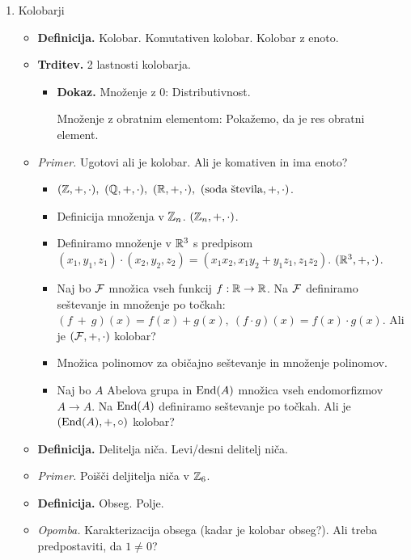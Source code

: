 \begin{enumerate}
    \item Kolobarji
    \begin{itemize}
        \item \colorbox{purple!30}{\textbf{Definicija.}} Kolobar. Komutativen kolobar. Kolobar z enoto.
        \item \colorbox{blue!30}{\textbf{Trditev.}} 2 lastnosti kolobarja.
        \begin{itemize}
            \item \colorbox{green!30}{\textbf{Dokaz.}} Množenje z $0$: Distributivnost.
            
            Množenje z obratnim elementom: Pokažemo, da je res obratni element.
        \end{itemize}
        \item \colorbox{yellow!30}{\emph{Primer.}}  Ugotovi ali je kolobar. Ali je komativen in ima enoto?
        \begin{itemize}
            \item  $(\ZZ, +, \cdot), \  (\QQ, +, \cdot), \ (\RR, +, \cdot), \ (\text{soda števila}, +, \cdot)$.
            \item Definicija množenja v $\mathbb{Z}_n$. $(\mathbb{Z}_n, +, \cdot)$. 
            \item Definiramo množenje v $\mathbb{R}^3$ s predpisom $(x_1, y_1, z_1) \cdot (x_2, y_2, z_2) = (x_1 x_2, x_1y_2 + y_1 z_1, z_1 z_2)$. $(\mathbb{R}^3, +, \cdot)$.
            \item Naj bo $\mathcal{F}$ množica vseh funkcij $f: \mathbb{R} \to \mathbb{R}$. Na $\mathcal{F}$ definiramo seštevanje in množenje po točkah: $(f~+~g)(x)=f(x)+g(x), \ (f \cdot g)(x) = f(x) \cdot g(x)$. Ali je $(\mathcal{F}, +, \cdot)$ kolobar?
            \item Množica polinomov za običajno seštevanje in množenje polinomov.
            \item Naj bo $A$ Abelova grupa in $\operatorname{End} (A)$ množica vseh endomorfizmov $A \to A$. Na $\operatorname{End} (A)$ definiramo seštevanje po točkah. Ali je $(\operatorname{End} (A), +, \circ)$ kolobar?
        \end{itemize}
        \item \colorbox{purple!30}{\textbf{Definicija.}} Delitelja niča. Levi/desni delitelj niča.
        \item \colorbox{yellow!30}{\emph{Primer.}} Poišči deljitelja niča v $\mathbb{Z}_6$.
        \item \colorbox{purple!30}{\textbf{Definicija.}} Obseg. Polje.
        \item \colorbox{yellow!30}{\emph{Opomba.}} Karakterizacija obsega (kadar je kolobar obseg?). Ali treba predpostaviti, da $1 \neq 0$?

\end{itemize}
\end{enumerate}
